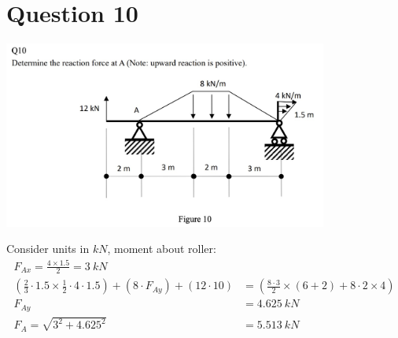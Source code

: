 \documentclass{article}
\begin{document}
\section*{Question 10}
\begin{center}
    \includegraphics[width=0.8\textwidth]{img/2-8.jpg}
\end{center}
Consider units in $kN$, moment about roller:
\begin{align*}
    F_{Ax}=\frac{4\times1.5}{2}=3\ kN                                                                                                            \\
    (\frac{2}{3}\cdot 1.5\times\frac{1}{2}\cdot 4\cdot 1.5) + (8\cdot F_{Ay}) + (12\cdot 10) & = (\frac{8\cdot 3}{2}\times(6+2)+8\cdot 2\times4) \\
    F_{Ay}                                                                                   & = 4.625\ kN                                       \\
    F_A = \sqrt{3^2+4.625^2}                                                                 & = 5.513\ kN                                       \\
\end{align*}
\end{document}
